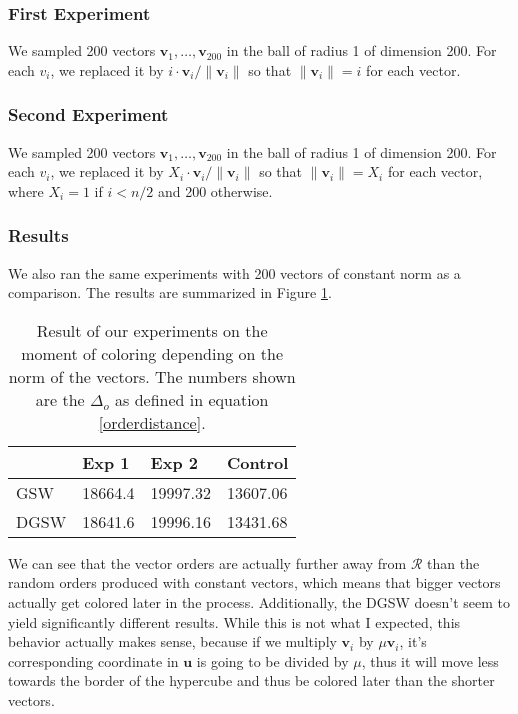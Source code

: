 \documentclass[12pt]{article}
\begin{document}
\subsubsection{First Experiment}
We sampled 200 vectors $\textbf{v}_1,\dots,\textbf{v}_{200}$ in the ball of radius 1 of dimension 200. For each $v_i$, we replaced it by $i\cdot \textbf{v}_i/\|\textbf{v}_i\|$ so that $\|\textbf{v}_i\|=i$ for each vector. 

\subsubsection{Second Experiment}
We sampled 200 vectors $\textbf{v}_1,\dots,\textbf{v}_{200}$ in the ball of radius 1 of dimension 200. For each $v_i$, we replaced it by $X_i\cdot \textbf{v}_i/\|\textbf{v}_i\|$ so that $\|\textbf{v}_i\|=X_i$ for each vector, where $X_i=1$ if $i<n/2$ and 200 otherwise.

\subsubsection{Results}
We also ran the same experiments with 200 vectors of constant norm as a comparison. The results are summarized in Figure \ref{norm_when_colored}.
\begin{center}
\begin{table}[h]
\begin{tabular}{l|lll}
     & Exp 1   & Exp 2    & Control  \\
\hline
GSW  & 18664.4 & 19997.32 & 13607.06 \\
DGSW & 18641.6 & 19996.16 & 13431.68
\end{tabular}
\caption{Result of our experiments on the moment of coloring depending on the norm of the vectors. The numbers shown are the $\Delta_o$ as defined in equation \ref{orderdistance}.}
\label{norm_when_colored}
\end{table}
\end{center}
We can see that the vector orders are actually further away from $\mathcal{R}$ than the random orders produced with constant vectors, which means that bigger vectors actually get colored later in the process. Additionally, the DGSW doesn't seem to yield significantly different results. While this is not what I expected, this behavior actually makes sense, because if we multiply $\textbf{v}_i$ by $\mu\textbf{v}_i$, it's corresponding coordinate in $\textbf{u}$ is going to be divided by $\mu$, thus it will move less towards the border of the hypercube and thus be colored later than the shorter vectors.
\end{document}
